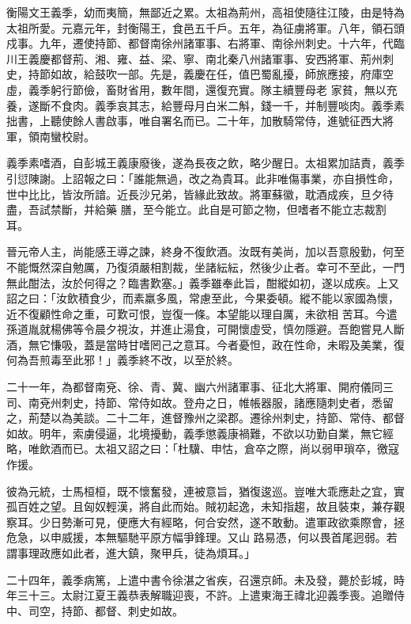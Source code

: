 \begin{pinyinscope}
 衡陽文王義季，幼而夷簡，無鄙近之累。太祖為荊州，高祖使隨往江陵，由是特為太祖所愛。元嘉元年，封衡陽王，食邑五千戶。五年，為征虜將軍。八年，領石頭戍事。九年，遷使持節、都督南徐州諸軍事、右將軍、南徐州刺史。十六年，代臨川王義慶都督荊、湘、雍、益、梁、寧、南北秦八州諸軍事、安西將軍、荊州刺史，持節如故，給鼓吹一部。先是，義慶在任，值巴蜀亂擾，師旅應接，府庫空虛，義季躬行節儉，畜財省用，數年間，還復充實。隊主續豐母老
 家貧，無以充養，遂斷不食肉。義季哀其志，給豐母月白米二斛，錢一千，并制豐啖肉。義季素拙書，上聽使餘人書啟事，唯自署名而已。二十年，加散騎常侍，進號征西大將軍，領南蠻校尉。



 義季素嗜酒，自彭城王義康廢後，遂為長夜之飲，略少醒日。太祖累加詰責，義季引愆陳謝。上詔報之曰：「誰能無過，改之為貴耳。此非唯傷事業，亦自損性命，世中比比，皆汝所諳。近長沙兄弟，皆緣此致故。將軍蘇徽，耽酒成疾，旦夕待盡，吾試禁斷，并給藥
 膳，至今能立。此自是可節之物，但嗜者不能立志裁割耳。



 晉元帝人主，尚能感王導之諫，終身不復飲酒。汝既有美尚，加以吾意殷勤，何至不能慨然深自勉厲，乃復須嚴相割裁，坐諸紜紜，然後少止者。幸可不至此，一門無此酣法，汝於何得之？臨書歎塞。」義季雖奉此旨，酣縱如初，遂以成疾。上又詔之曰：「汝飲積食少，而素羸多風，常慮至此，今果委頓。縱不能以家國為懷，近不復顧性命之重，可歎可恨，豈復一條。本望能以理自厲，未欲相
 苦耳。今遣孫道胤就楊佛等令晨夕視汝，并進止湯食，可開懷虛受，慎勿隱避。吾飽嘗見人斷酒，無它慊吸，蓋是當時甘嗜罔己之意耳。今者憂怛，政在性命，未暇及美業，復何為吾煎毒至此邪！」義季終不改，以至於終。



 二十一年，為都督南兗、徐、青、冀、幽六州諸軍事、征北大將軍、開府儀同三司、南兗州刺史，持節、常侍如故。登舟之日，帷帳器服，諸應隨刺史者，悉留之，荊楚以為美談。二十二年，進督豫州之梁郡。遷徐州刺史，持節、常侍、都督
 如故。明年，索虜侵逼，北境擾動，義季懲義康禍難，不欲以功勤自業，無它經略，唯飲酒而已。太祖又詔之曰：「杜驥、申怙，倉卒之際，尚以弱甲瑣卒，徼寇作援。



 彼為元統，士馬桓桓，既不懷奮發，連被意旨，猶復逡巡。豈唯大乖應赴之宜，實孤百姓之望。且匈奴輕漢，將自此而始。賊初起逸，未知指趨，故且裝束，兼存觀察耳。少日勢漸可見，便應大有經略，何合安然，遂不敢動。遣軍政欲乘際會，拯危急，以申威援，本無驅馳平原方幅爭鋒理。又山
 路易憑，何以畏首尾迥弱。若謂事理政應如此者，進大鎮，聚甲兵，徒為煩耳。」



 二十四年，義季病篤，上遣中書令徐湛之省疾，召還京師。未及發，薨於彭城，時年三十三。太尉江夏王義恭表解職迎喪，不許。上遣東海王禕北迎義季喪。追贈侍中、司空，持節、都督、刺史如故。




\end{pinyinscope}

